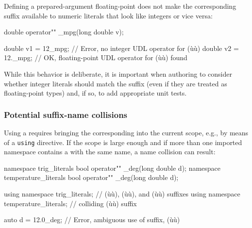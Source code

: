 Defining a prepared-argument floating-point  does
not make the corresponding suffix available to numeric literals that
look like integers or vice versa:

\begin{emcppslisting}
double operator"" _mpg(long double v);

double v1 = 12_mpg;   // Error, no integer UDL operator for (ù{}ù)
double v2 = 12._mpg;  // OK, floating-point UDL operator for (ù{}ù) found
\end{emcppslisting}
    
\noindent While this behavior is deliberate, it is important when authoring
 to consider whether integer literals should match
the suffix (even if they are treated as floating-point types) and, if
so, to add appropriate unit tests.

\subsubsection[Potential suffix-name collisions]{Potential suffix-name collisions}\label{potential-suffix-name-collisions}

Using a  requires bringing the corresponding
 into the current scope, e.g., by means of a
\lstinline!using! directive. If the scope is large enough and if more than
one imported namespace contains a  with the same
name, a name collision can result:

\begin{emcppshiddenlisting}[emcppsbatch=e25]
namespace trig_literals {
bool operator"" _deg(long double d);
}
namespace temperature_literals {
bool operator"" _deg(long double d);
}
\end{emcppshiddenlisting}
\begin{emcppslisting}[emcppsbatch=e25]
using namespace trig_literals;        // (ù{}ù), (ù{}ù), and (ù{}ù) suffixes
using namespace temperature_literals; // colliding (ù{}ù) suffix

auto d = 12.0_deg;  // Error, ambiguous use of suffix, (ù{}ù)
\end{emcppslisting}
    

